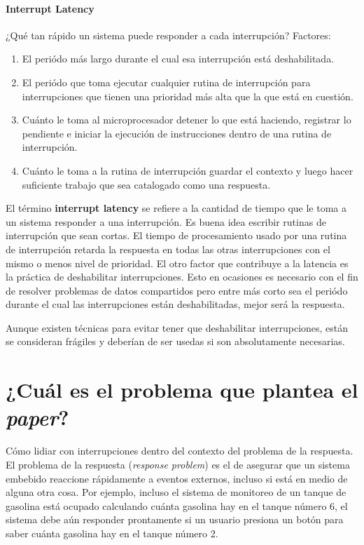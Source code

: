 \paragraph{\textnormal{\textbf{Interrupt Latency}}}
¿Qué tan rápido un sistema puede responder a cada interrupción? Factores:
\begin{enumerate}
    \item El periódo más largo durante el cual esa interrupción está deshabilitada.
    \item El periódo que toma ejecutar cualquier rutina de interrupción para interrupciones que tienen una prioridad más alta que la que está en cuestión.
    \item Cuánto le toma al microprocesador detener lo que está haciendo, registrar lo pendiente e iniciar la ejecución de instrucciones dentro de una rutina de interrupción.
    \item Cuánto le toma a la rutina de interrupción guardar el contexto y luego hacer suficiente trabajo que sea catalogado como una respuesta.
\end{enumerate}

El término \textbf{interrupt latency} se refiere a la cantidad de tiempo que le toma a un sistema responder a una interrupción. Es buena idea escribir rutinas de interrupción que sean cortas. El tiempo de procesamiento usado por una rutina de interrupción retarda la respuesta en todas las otras interrupciones con el mismo o menos nivel de prioridad. El otro factor que contribuye a la latencia es la práctica de deshabilitar interrupciones. Esto en ocasiones es necesario con el fin de resolver problemas de datos compartidos pero entre más corto sea el periódo durante el cual las interrupciones están deshabilitadas, mejor será la respuesta. 

Aunque existen técnicas para evitar tener que deshabilitar interrupciones, están se consideran frágiles y deberían de ser usedas si son absolutamente necesarias.


\section{¿Cuál es el problema que plantea el \textit{paper}?}
Cómo lidiar con interrupciones dentro del contexto del problema de la respuesta. El problema de la respuesta (\textit{response problem}) es el de asegurar que un sistema embebido reaccione rápidamente a eventos externos, incluso si está en medio de alguna otra cosa. Por ejemplo, incluso el sistema de monitoreo de un tanque de gasolina está ocupado calculando cuánta gasolina hay en el tanque número 6, el sistema debe aún responder prontamente si un usuario presiona un botón para saber cuánta gasolina hay en el tanque número 2.

